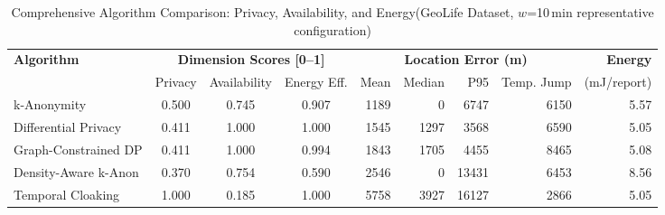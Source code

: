 \begin{table}[!t]
\centering
\caption{Comprehensive Algorithm Comparison: Privacy, Availability, and Energy(GeoLife Dataset, $w$=10\,min representative configuration)}
\label{tab:master}
\begin{tabular}{l|ccc|rrrr|r}
\toprule
\multirow{2}{*}{\textbf{Algorithm}} & \multicolumn{3}{c|}{\textbf{Dimension Scores [0--1]}} & \multicolumn{4}{c|}{\textbf{Location Error (m)}} & \textbf{Energy} \\
 & Privacy & Availability & Energy Eff. & Mean & Median & P95 & Temp. Jump & (mJ/report) \\
\midrule
  k-Anonymity & 0.500 & 0.745 & 0.907 & 1189 & 0 & 6747 & 6150 & 5.57 \\
  Differential Privacy & 0.411 & 1.000 & 1.000 & 1545 & 1297 & 3568 & 6590 & 5.05 \\
  Graph-Constrained DP & 0.411 & 1.000 & 0.994 & 1843 & 1705 & 4455 & 8465 & 5.08 \\
  Density-Aware k-Anon & 0.370 & 0.754 & 0.590 & 2546 & 0 & 13431 & 6453 & 8.56 \\
  Temporal Cloaking & 1.000 & 0.185 & 1.000 & 5758 & 3927 & 16127 & 2866 & 5.05 \\
\bottomrule
\end{tabular}
\end{table}
